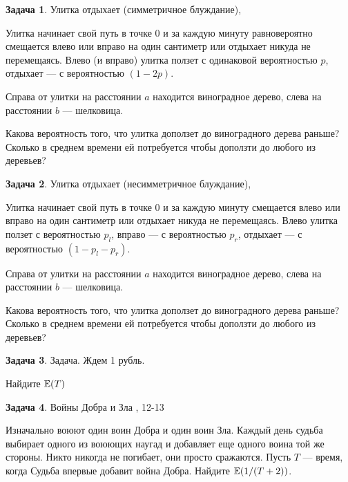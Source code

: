 \documentclass[pdftex,12pt,a4paper]{article}
\numberwithin{equation}{page} %
\theoremstyle{definition} %
\theoremstyle{definition}
\theoremstyle{definition}
\theoremstyle{definition}
\newtheorem{problem}{Задача}
\begin{document}
\begin{problem} Улитка отдыхает (симметричное блуждание), \cite{blom:pspt}

Улитка начинает свой путь в точке 0 и за каждую минуту равновероятно смещается влево или вправо на один сантиметр или отдыхает никуда не перемещаясь. Влево (и вправо) улитка ползет с одинаковой вероятностью $p$, отдыхает --- с вероятностью $(1-2p)$. 

Справа от улитки на расстоянии $a$ находится виноградное дерево, слева на расстоянии $b$ --- шелковица.

Какова вероятность того, что улитка доползет до виноградного дерева раньше? Сколько в среднем времени ей потребуется чтобы доползти до любого из деревьев?
\end{problem}


\begin{problem}  Улитка отдыхает (несимметричное блуждание), \cite{blom:pspt}

Улитка начинает свой путь в точке 0 и за каждую минуту смещается влево или вправо на один сантиметр или отдыхает никуда не перемещаясь. Влево улитка ползет с вероятностью $p_{l}$, вправо --- с вероятностью $p_{r}$, отдыхает --- с вероятностью $(1-p_{l}-p_{r})$. 

Справа от улитки на расстоянии $a$ находится виноградное дерево, слева на расстоянии $b$ --- шелковица.

Какова вероятность того, что улитка доползет до виноградного дерева раньше? Сколько в среднем времени ей потребуется чтобы доползти до любого из деревьев?
\end{problem}

\begin{problem} 
Задача. Ждем 1 рубль. 

Найдите $\mathbb{E}(T)$
\end{problem}

\begin{problem} Войны Добра и Зла \cite{stirzaker:otep}, 12-13

Изначально воюют один воин Добра и один воин Зла. Каждый день судьба выбирает одного из воюющих наугад и добавляет еще одного воина той же стороны. Никто никогда не погибает, они просто сражаются. Пусть $T$ --- время, когда Судьба впервые добавит война Добра.  Найдите $\mathbb{E}(1/(T+2)) $.
\end{problem}
\end{document}
